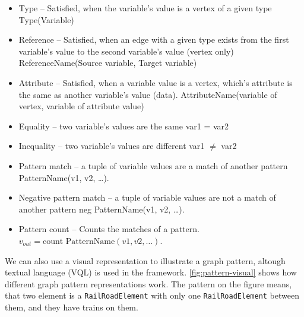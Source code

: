 \begin{itemize}
	\item Type -- Satisfied, when the variable's value is a vertex of a given type
	\newline Type(Variable)
	
	\item Reference -- Satisfied, when an edge with a given type exists from the first variable's value to the second variable's value (vertex only)
	\newline ReferenceName(Source variable, Target variable)
	
	\item Attribute -- Satisfied, when a variable value is a vertex, which's attribute is the same as another variable's value (data).
	\newline AttributeName(variable of vertex, variable of attribute value)
		
	\item Equality -- two variable's values are the same
	\newline var1 = var2
		
	\item Inequality -- two variable's values are different
	\newline var1 $\neq$ var2
	
	\item Pattern match -- a tuple of variable values are a match of another pattern	
	\newline PatternName(v1, v2, \dots{}).
	
	\item Negative pattern match -- a tuple of variable values are not a match of another pattern	
	\newline neg PatternName(v1, v2, \dots{}).
	
	\item Pattern count -- Counts the matches of a pattern.
	\newline $v_{out} = \text{count PatternName}(v1, v2, \dots{})$.
\end{itemize}

We can also use a visual representation to illustrate a graph pattern, altough textual language (VQL) is used in the framework. 
\autoref{fig:pattern-visual} shows how different graph pattern representations work. The pattern on the figure means, that two element is a \texttt{RailRoadElement} with only one \texttt{RailRoadElement} between them, and they have trains on them.



